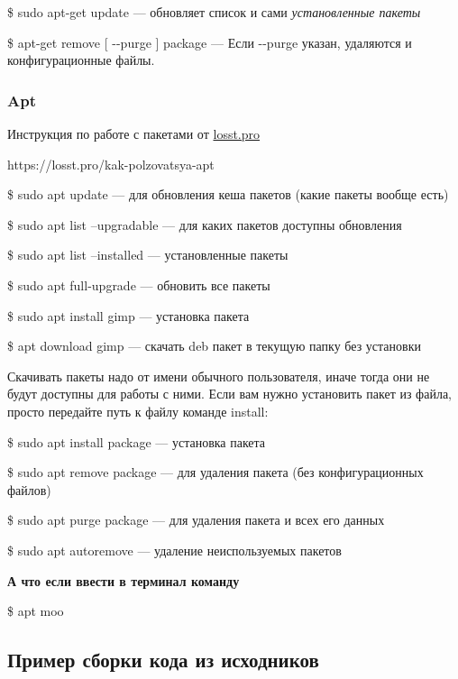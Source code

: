 \documentclass[oneside, final, 14pt]{extreport} %
\begin{document}
\$ sudo apt-get update --- обновляет список и сами \textit{установленные пакеты}

\$ apt-get remove [ \--\--purge ] package --- Если \--\--purge указан, удаляются и конфигурационные файлы.

\subsubsection{Apt}

Инструкция по работе с пакетами от \href{https://losst.pro/kak-polzovatsya-apt}{losst.pro}

https://losst.pro/kak-polzovatsya-apt 

\vspace*{\baselineskip}

\$ sudo apt update --- для обновления кеша пакетов (какие пакеты вообще есть)

\$ sudo apt list --upgradable --- для каких пакетов доступны обновления

\$ sudo apt list --installed --- установленные пакеты

\$ sudo apt full-upgrade --- обновить все пакеты

\$ sudo apt install gimp --- установка пакета

\$ apt download gimp --- скачать deb пакет в текущую папку без установки

Скачивать пакеты надо от имени обычного пользователя, иначе тогда они не будут доступны для работы с ними. Если вам нужно установить пакет из файла, просто передайте путь к файлу команде install:

\$ sudo apt install package --- установка пакета

\$ sudo apt remove package --- для удаления пакета (без конфигурационных файлов)

\$ sudo apt purge package --- для удаления пакета и всех его данных

\$ sudo apt autoremove --- удаление неиспользуемых пакетов

\vspace*{\baselineskip}

\textbf{А что если ввести в терминал команду}

\$ apt moo

\subsection{Пример сборки кода из исходников}


    
\end{document}
